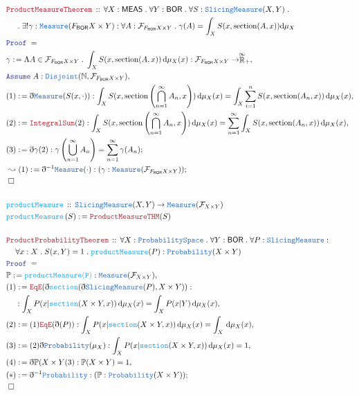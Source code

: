 \documentclass[12pt]{scrartcl}
\newcommand{\TYPE}[1]{\textcolor{NavyBlue}{\mathtt{#1}}}
\newcommand{\FUNC}[1]{\textcolor{Cerulean}{\mathtt{#1}}}
\newcommand{\LOGIC}[1]{\textcolor{Blue}{\mathtt{#1}}}
\newcommand{\THM}[1]{\textcolor{Maroon}{\mathtt{#1}}}
\renewcommand{\.}{\; . \;}
\newcommand{\de}{: \kern 0.1pc =}
\newcommand{\Act}[1]{\left( #1 \right)}
\newcommand{\Theorem}[2]{& \THM{#1} \, :: \, #2 \\ & \Proof = \\ }
\newcommand{\DeclareFunc}[2]{& \FUNC{#1} \, :: \, #2 \\}
\newcommand{\DefineFunc}[3]{&  \FUNC{#1}\Act{#2} \de #3 \\}
\newcommand{\NewLine}{\\ & \kern 1pc}
\newcommand{\ForEach}[3]{\forall #1 : #2 \. #3 }
\newcommand{\Exist}[2]{\exists #1 : #2}
\newcommand{\Nat}{\mathbb{N} }
\newcommand{\EReals}{\stackrel{\mathclap{\infty}}{\mathbb{R}}}
\newcommand{\Say}[3]{& #1 \de #2 : #3, \\}
\newcommand{\Conclude}[3]{& #1 \de #2 : #3; \\}
\newcommand{\DeriveConclude}[3]{& \leadsto #1 \de #2 : #3 ; \\}
\newcommand{\A}{\LOGIC{Assume} \;}
\newcommand{\Assume}[2]{& \A #1 : #2, \\}
\newcommand{\QED}{\; \square}
\newcommand{\EndProof}{& \QED \\}
\newcommand{\ByDef}{\eth}
\newcommand{\Proof}{\LOGIC{Proof} \; }
\newcommand{\BOR}{\mathsf{BOR}}
\newcommand{\F}{\mathcal{F}}
\begin{document}
 \newpage
 \begin{align*}
 \Theorem{ProductMeasureTheorem}{
 \ForEach{X}{\mathsf{MEAS}}{
 \ForEach{Y}{\mathsf{BOR}}{
 \ForEach{S}{\TYPE{SlicingMeasure}(X,Y)}{
  \NewLine \.
 \Exist{!\gamma}{\TYPE{Measure}(F_{\mathsf{BOR}} X \times Y)
  : 
  \ForEach{A}{ \F_{F_{\mathsf{BOR}} X \times Y} }{
  \gamma(A) = \int_X S(x ,\mathrm{section}(A,x)) \mathrm{d}\mu_X  
 }}}}}}
\Say{\gamma}{ \Lambda A \in \F_{ F_\BOR X \times Y} \. \int_X S( x, \mathrm{section}(A,x) ) \, \mathrm{d}\mu_X(x) }{\F_{F_\BOR X \times Y} \to \EReals_+}
\Assume{ A }{\TYPE{Disjoint}(\Nat,\F_{F_\BOR X \times Y})}
\Say{(1)}{ \ByDef\TYPE{Measure}(S(x, \cdot))} {\int_X S( x, \mathrm{section}\Act{ \bigcap^\infty_{n=1} A_n,x} ) \, \mathrm{d}\mu_X(x) =
\int_X \sum^n_{i = 1} S( x, \mathrm{section}(A_n,x) ) \, \mathrm{d}\mu_X(x)}
\Say{(2)}{\THM{IntegralSum}(2)}{\int_X S( x, \mathrm{section}\Act{ \bigcap^\infty_{n=1} A_n,x} ) \, \mathrm{d}\mu_X(x) =
\sum^\infty_{n=1} \int_X  S( x, \mathrm{section}(A_n,x) ) \, \mathrm{d}\mu_X(x)}
\Conclude{(3)}{\ByDef \gamma (2)}{ \gamma\Act{\bigcup^\infty_{n = 1} A_n} = \sum^\infty_{n = 1} \gamma(A_n)}
\DeriveConclude{(1)}{ \ByDef^{-1} \TYPE{Measure}(\cdot) }{ (\gamma : \TYPE{Measure}(\F_{F_\BOR X \times Y}))}
\EndProof
\\
\DeclareFunc{productMeasure}{ \TYPE{SlicingMeasure}(X,Y) \to \TYPE{Measure}(\F_{X \times Y})}
\DefineFunc{productMeasure}{S}{\THM{ProductMeasureTHM}(S)}
\\
\Theorem{ProductProbabilityTheorem}{
\ForEach{X}{\TYPE{ProbabilitySpace}}{
\ForEach{Y}{\BOR}{
\ForEach{P}{ \TYPE{SlicingMeasure} : \NewLine \ForEach{x}{X}{ S(x, Y) = 1}  }{
\FUNC{productMeasure}(P) : \TYPE{Probability}(X \times Y ) 
}}}}
\Say{\mathbb{P}}{\FUNC{productMeasure(P)}}{\TYPE{Measure}(\F_{X \times Y})}
\Say{(1)}{\THM{EqE}(\ByDef\FUNC{section}(\ByDef\TYPE{SlicingMeasure}(P),X \times Y))}{\NewLine : \int_X P(x | \FUNC{section}(X \times Y,x)) \, \mathrm{d}\mu_X(x) 
 = \int_X P(x  | Y) \, \mathrm{d}\mu_X(x)  }
\Say{(2)}{(1)\THM{EqE}(\ByDef(P))}{ \int_X P(x | \FUNC{section}(X \times Y,x)) \, \mathrm{d}\mu_X(x) 
 = \int_X \, \mathrm{d}\mu_X(x)}
\Say{(3)}{(2)\ByDef \TYPE{Probability}(\mu_X)}{\int_X P(x | \FUNC{section}(X \times Y,x)) \, \mathrm{d}\mu_X(x) = 1 }
\Say{(4)}{\ByDef{\mathbb{P}(X \times Y}(3)}{\mathbb{P}(X \times Y) = 1}
\Conclude{(*)}{\ByDef^{-1}\TYPE{Probability}}{(\mathbb{P} : \TYPE{Probability}(X \times Y))}
\EndProof
 \end{align*}
 \newpage
\end{document}
